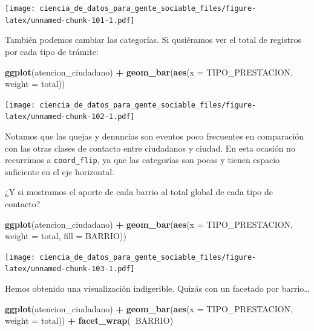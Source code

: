 \documentclass[]{book}
\newenvironment{Shaded}{\begin{snugshade}}{\end{snugshade}}
\newcommand{\KeywordTok}[1]{\textcolor[rgb]{0.13,0.29,0.53}{\textbf{#1}}}
\newcommand{\DataTypeTok}[1]{\textcolor[rgb]{0.13,0.29,0.53}{#1}}
\newcommand{\StringTok}[1]{\textcolor[rgb]{0.31,0.60,0.02}{#1}}
\newcommand{\OperatorTok}[1]{\textcolor[rgb]{0.81,0.36,0.00}{\textbf{#1}}}
\newcommand{\NormalTok}[1]{#1}
\begin{document}
\texttt{[image: ciencia\_de\_datos\_para\_gente\_sociable\_files/figure-latex/unnamed-chunk-101-1.pdf]}

También podemos cambiar las categorías. Si qusiéramos ver el total de
registros por cada tipo de trámite:

\begin{Shaded}
\begin{Highlighting}[]
\KeywordTok{ggplot}\NormalTok{(atencion_ciudadano) }\OperatorTok{+}
\StringTok{    }\KeywordTok{geom_bar}\NormalTok{(}\KeywordTok{aes}\NormalTok{(}\DataTypeTok{x =}\NormalTok{ TIPO_PRESTACION, }\DataTypeTok{weight =}\NormalTok{ total)) }
\end{Highlighting}
\end{Shaded}

\texttt{[image: ciencia\_de\_datos\_para\_gente\_sociable\_files/figure-latex/unnamed-chunk-102-1.pdf]}

Notamos que las quejas y denuncias son eventos poco frecuentes en
comparación con las otras clases de contacto entre ciudadanos y ciudad.
En esta ocasión no recurrimos a \texttt{coord\_flip}, ya que las
categorías son pocas y tienen espacio suficiente en el eje horizontal.

¿Y si mostramos el aporte de cada barrio al total global de cada tipo de
contacto?

\begin{Shaded}
\begin{Highlighting}[]
\KeywordTok{ggplot}\NormalTok{(atencion_ciudadano) }\OperatorTok{+}
\StringTok{    }\KeywordTok{geom_bar}\NormalTok{(}\KeywordTok{aes}\NormalTok{(}\DataTypeTok{x =}\NormalTok{ TIPO_PRESTACION, }\DataTypeTok{weight =}\NormalTok{ total, }\DataTypeTok{fill =}\NormalTok{ BARRIO)) }
\end{Highlighting}
\end{Shaded}

\texttt{[image: ciencia\_de\_datos\_para\_gente\_sociable\_files/figure-latex/unnamed-chunk-103-1.pdf]}

Hemos obtenido una visualización indigerible. Quizás con un facetado por
barrio\ldots{}

\begin{Shaded}
\begin{Highlighting}[]
\KeywordTok{ggplot}\NormalTok{(atencion_ciudadano) }\OperatorTok{+}
\StringTok{    }\KeywordTok{geom_bar}\NormalTok{(}\KeywordTok{aes}\NormalTok{(}\DataTypeTok{x =}\NormalTok{ TIPO_PRESTACION, }\DataTypeTok{weight =}\NormalTok{ total)) }\OperatorTok{+}
\StringTok{    }\KeywordTok{facet_wrap}\NormalTok{(}\OperatorTok{~}\NormalTok{BARRIO)}
\end{Highlighting}
\end{Shaded}
\end{document}

